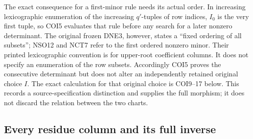 The exact consequence for a first-minor rule needs its actual order.
In increasing lexicographic enumeration of the increasing $q'$-tuples
of row indices, $I_0$ is the very first tuple, so COI5 evaluates that
rule before any search for a later nonzero determinant.
The original frozen DNE3, however, states a ``fixed ordering of all
subsets''; NSO12 and NCT7 refer to the first ordered nonzero minor.
Their printed lexicographic convention is for upper-root coefficient
columns. It does not specify an enumeration of the row subsets.
Accordingly COI5 proves the consecutive determinant but does not
alter an independently retained original choice $I$.
The exact calculation for that original choice is COI9--17 below.
This records a source-specification distinction and supplies the full
morphism; it does not discard the relation between the two charts.

\subsection{Every residue column and its full inverse}

